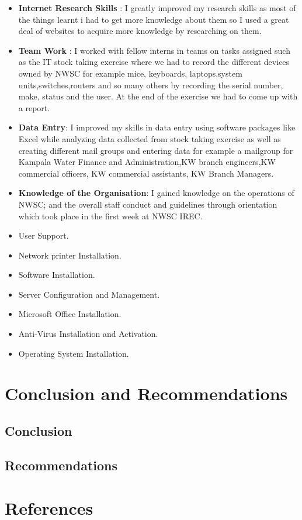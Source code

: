 \documentclass{article}
\begin{document}
\begin{itemize}
\item \textbf{Internet Research Skills} : I greatly improved my research skills as most of the things learnt i had to get more knowledge about them so I used a great deal of websites to acquire more knowledge by researching on them.
\item \textbf{Team Work} : I worked with fellow interns in teams on tasks assigned such as the IT stock taking exercise where we had to record the different devices owned by NWSC for example mice, keyboards, laptops,system units,switches,routers and so many others by recording the serial number, make, status and the user. At the end of the exercise we had to come up with a report. 
\item \textbf{Data Entry}: I improved my skills in data entry using software packages like Excel while analyzing data collected from stock taking exercise as well as creating different mail groups and entering data for example a mailgroup for Kampala Water Finance and Administration,KW branch engineers,KW commercial officers, KW commercial assistants, KW Branch Managers.
\item \textbf{Knowledge of the Organisation}: I gained knowledge on the operations of NWSC; and the overall staff conduct and guidelines through orientation which took place in the first week at NWSC IREC.
\item User Support.
\item Network printer Installation.
\item Software Installation.
\item Server Configuration and Management.
\item Microsoft Office Installation.
\item Anti-Virus Installation and Activation.
\item Operating System Installation.
\end{itemize}
\section{Conclusion and Recommendations}
\subsection{Conclusion}
\subsection{Recommendations}
\section{References}
\end{document}
